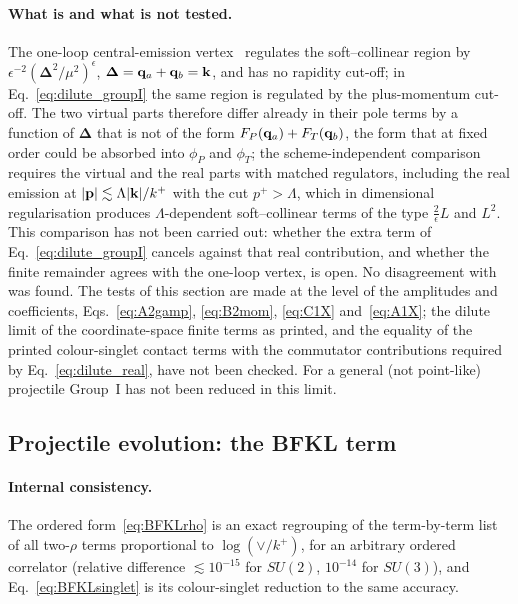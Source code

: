 \paragraph{What is and what is not tested.} The one-loop central-emission vertex~\cite{Fadin:1998py,DelDuca:1998cx,Bartels:2006hg} regulates the soft--collinear region by $\epsilon^{-2}(\boldsymbol\Delta^2/\mu^2)^\epsilon$, $\boldsymbol\Delta=\mathbf{q}_a+\mathbf{q}_b=\mathbf{k}$, and has no rapidity cut-off; in Eq.~\eqref{eq:dilute_groupI} the same region is regulated by the plus-momentum cut-off. The two virtual parts therefore differ already in their pole terms by a function of $\boldsymbol\Delta$ that is not of the form $F_P(\mathbf{q}_a)+F_T(\mathbf{q}_b)$, the form that at fixed order could be absorbed into $\phi_P$ and $\phi_T$; the scheme-independent comparison requires the virtual and the real parts with matched regulators, including the real emission at $|\mathbf{p}|\lesssim\Lambda|\mathbf{k}|/k^+$ with the cut $p^+>\Lambda$, which in dimensional regularisation produces $\Lambda$-dependent soft--collinear terms of the type $\frac2\epsilon L$ and $L^2$. This comparison has not been carried out: whether the extra term of Eq.~\eqref{eq:dilute_groupI} cancels against that real contribution, and whether the finite remainder agrees with the one-loop vertex, is open. No disagreement with~\cite{Fadin:1998py,Bartels:2006hg} was found. The tests of this section are made at the level of the amplitudes and coefficients, Eqs.~\eqref{eq:A2gamp}, \eqref{eq:B2mom}, \eqref{eq:C1X} and~\eqref{eq:A1X}; the dilute limit of the coordinate-space finite terms as printed, and the equality of the printed colour-singlet contact terms with the commutator contributions required by Eq.~\eqref{eq:dilute_real}, have not been checked. For a general (not point-like) projectile Group~I has not been reduced in this limit.

\subsection{Projectile evolution: the BFKL term}\label{sec:check_BFKL}

\paragraph{Internal consistency.} The ordered form~\eqref{eq:BFKLrho} is an exact regrouping of the term-by-term list of all two-$\rho$ terms proportional to $\log(\vee/k^+)$, for an arbitrary ordered correlator (relative difference $\lesssim10^{-15}$ for $SU(2)$, $10^{-14}$ for $SU(3)$), and Eq.~\eqref{eq:BFKLsinglet} is its colour-singlet reduction to the same accuracy.

